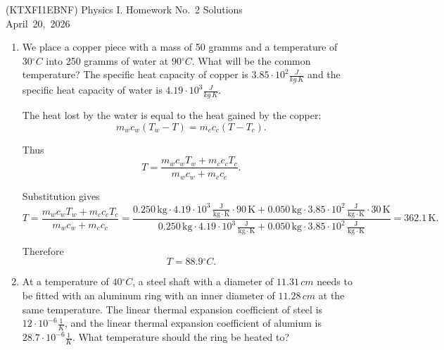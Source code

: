 \documentclass[a4paper,12pt]{letter}
\begin{document}
\begin{center}
 (KTXFI1EBNF) Physics I. Homework No.~2 Solutions\\ \smallskip
April~20,~2026
\end{center}

\begin{enumerate}

\item We place a copper piece with a mass of 50 gramms and a temperature of $30{}^{\circ}C$ into 250 gramms of water at $90{}^{\circ}C$. What will be the common temperature? The specific heat capacity of copper is $3.85 \cdot 10^{2}\frac{J}{kg\,K}$ and the specific heat capacity of water is $4.19 \cdot 10^{3}\frac{J}{kg\,K}$.

\begin{center}
\end{center}

The heat lost by the water is equal to the heat gained by the copper:
$$m_w c_w(T_w-T)=m_c c_c(T-T_c).$$

Thus
$$T=\frac{m_w c_wT_w+m_c c_cT_c}{m_w c_w+m_c c_c}.$$

Substitution gives
$$T=\frac{m_w c_wT_w+m_c c_cT_c}{m_w c_w+m_c c_c}=\frac{0.250\,\mathrm{kg}\cdot 4.19\cdot 10^3\,\mathrm{\frac{J}{kg\cdot K}}\cdot 90\,\mathrm{K}+0.050\,\mathrm{kg}\cdot 3.85\cdot 10^2\,\mathrm{\frac{J}{kg\cdot K}}\cdot 30\,\mathrm{K}}{0.250\,\mathrm{kg}\cdot 4.19\cdot 10^3\,\mathrm{\frac{J}{kg\cdot K}}+0.050\,\mathrm{kg}\cdot 3.85\cdot 10^2\,\mathrm{\frac{J}{kg\cdot K}}}=362.1\,\mathrm{K}.$$

Therefore
$$\boxed{T=88.9{}^{\circ}C.}$$


\bigskip

\item At a temperature of $40{}^{\circ}C$, a steel shaft with a diameter of $11.31\,cm$ needs to be fitted with an aluminum ring with an inner diameter of $11.28\,cm$ at the same temperature. The linear thermal expansion coefficient of steel is $12 \cdot 10^{-6}\frac{1}{K}$, and the linear thermal expansion coefficient of alumium is $28.7 \cdot 10^{-6}\frac{1}{K}$. What temperature should the ring be heated to?


\end{enumerate}
\end{document}
